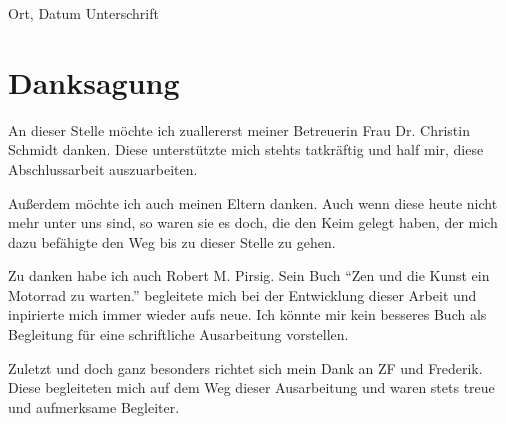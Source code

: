 \vspace{4cm}

\hspace{2cm} Ort, Datum \hfill Unterschrift \hspace{2cm}


\newpage

\section*{Danksagung}

An dieser Stelle möchte ich zuallererst meiner Betreuerin Frau Dr. Christin Schmidt danken. Diese unterstützte mich stehts tatkräftig und half mir, diese Abschlussarbeit auszuarbeiten.

Außerdem möchte ich auch  meinen Eltern danken. Auch wenn diese heute nicht mehr unter uns sind, so waren sie es doch, die den Keim gelegt haben, der mich dazu befähigte den Weg bis zu dieser Stelle zu gehen.

Zu danken habe ich auch Robert M. Pirsig. Sein Buch "`Zen und die Kunst ein Motorrad zu warten."' begleitete mich bei der Entwicklung dieser Arbeit und inpirierte mich immer wieder aufs neue. Ich könnte mir kein besseres Buch als Begleitung für eine schriftliche Ausarbeitung vorstellen.

Zuletzt und doch ganz besonders richtet sich mein Dank an ZF und Frederik. Diese begleiteten mich auf dem Weg dieser Ausarbeitung und waren stets treue und aufmerksame Begleiter.



